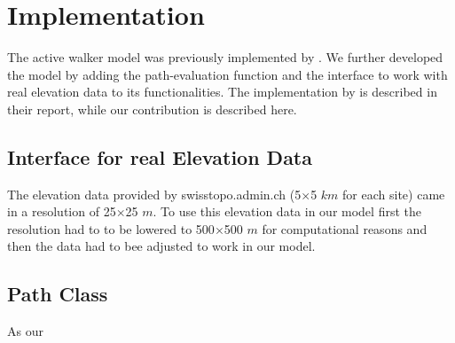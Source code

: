 \section{Implementation}

The active walker model was previously implemented by \citet{trailsystems}. We further developed the model by adding the path-evaluation function and the interface to work with real elevation data to its functionalities. The implementation by \citet{trailsystems} is described in their report, while our contribution is described here.

\subsection{Interface for real Elevation Data}

The elevation data provided by swisstopo.admin.ch (5$\times$5 $km$ for each site) came in a resolution of 25$\times$25 $m$. To use this elevation data in our model first the resolution had to to be lowered to 500$\times$500 $m$ for computational reasons and then the data had to bee adjusted to work in our model. 


\subsection{Path Class}
As our 